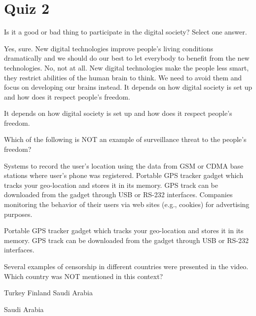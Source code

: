 \section{Quiz 2}

\begin{question}[type=exam]
Is it a good or bad thing to participate in the digital society? Select one answer.
\begin{itemize}
\chk Yes, sure. New digital technologies improve people's living conditions dramatically and we should do our best to let everybody to benefit from the new technologies.
\chk No, not at all. New digital technologies make the people less smart, they restrict abilities of the human brain to think. We need to avoid them and focus on developing our brains instead.
\chk It depends on how digital society is set up and how does it respect people's freedom.
\end{itemize}
\end{question}
\begin{solution}
It depends on how digital society is set up and how does it respect people's freedom.
\end{solution}

\begin{question}[type=exam]
Which of the following is NOT an example of surveillance threat to the people's freedom?
\begin{itemize}
\chk Systems to record the user's location using the data from GSM or CDMA base stations where user's phone was registered.
\chk Portable GPS tracker gadget which tracks your geo-location and stores it in its memory. GPS track can be downloaded from the gadget through USB or RS-232 interfaces.
\chk Companies monitoring the behavior of their users via web sites (e.g., cookies) for advertising purposes.
\end{itemize}
\end{question}
\begin{solution}
Portable GPS tracker gadget which tracks your geo-location and stores it in its memory. GPS track can be downloaded from the gadget through USB or RS-232 interfaces.
\end{solution}

\begin{question}[type=exam]
Several examples of censorship in different countries were presented in the video. Which country was NOT mentioned in this context?
\begin{itemize}
\chk Turkey
\chk Finland
\chk Saudi Arabia
\end{itemize}
\end{question}
\begin{solution}
Saudi Arabia
\end{solution}

